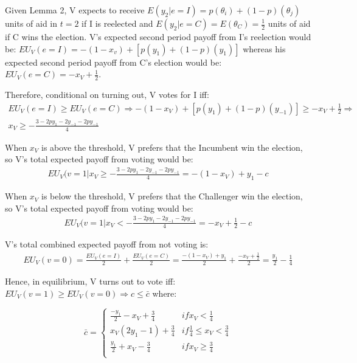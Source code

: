 \documentclass[12pt]{paper}
\begin{document}
Given Lemma 2, V expects to receive $E(y_2 | e=I) = p(\theta_i )+(1-p)(\theta_j)$ units of aid in $t=2$ if I is reelected and $E(y_2 |e=C)=E(\theta_C )=\frac{1}{2}$ units of aid if C wins the election.  V’s expected second period payoff from I’s reelection would be: $EU_V (e=I) = -(1 - x_v ) + [p(y_1 ) + (1 - p)(y_1 )]$ whereas his expected second period payoff from C’s election would be: $EU_V (e=C) = - x_V + \frac{1}{2}$. 

Therefore, conditional on turning out, V votes for I iff: 
\begin{gather}
EU_V (e=I) \geq EU_V (e=C) \Rightarrow 
-(1 - x_V ) + [p(y_1 ) + (1 - p)(y_{-1} )] \geq - x_V + \frac{1}{2} \Rightarrow \\
x_V \geq -\frac{3 - 2py_1 - 2y_{-1} - 2py_{-1}}{4}
\end{gather}

When $x_V$ is above the threshold, V prefers that the Incumbent win the election, so V’s total expected payoff from voting would be:
\begin{gather}
 EU_V (v=1 | x_V \geq -\frac{3 - 2py_1 - 2y_{-1} - 2py_{-1}}{4} =
  - (1 - x_V ) + y_1 - c
\end{gather}

When $x_V$ is below the threshold, V prefers that the Challenger win the election, so V’s total expected payoff from voting would be:
\begin{gather}
 EU_V (v=1 | x_V < -\frac{3 - 2py_1 - 2y_{-1} - 2py_{-1}}{4} =
  -x_V + \frac{1}{2} - c
\end{gather}

V’s total combined expected payoff from not voting is:
\begin{gather}
EU_V (v=0) = \frac{EU_V (e=I)}{2} + \frac{EU_V (e=C)}{2} = 
\frac{- (1 - x_V ) + y_1}{2} + \frac{-x_V + \frac{1}{2}}{2} = 
\frac{y_1}{2} - \frac{1}{4}
\end{gather}

Hence, in equilibrium, V turns out to vote iff: $EU_V (v=1) \geq EU_V (v=0) \Rightarrow c \leq \bar{c}$ where:

\begin{equation}
\bar{c} =
\begin{cases}
\frac{-y_1}{2} - x_V + \frac{3}{4} & if x_V < \frac{1}{4}\\    
x_V (2y_1 - 1) + \frac{3}{4}     & if \frac{1}{4} \leq x_V < \frac{3}{4}  \\
\frac{y_1}{2} + x_V - \frac{3}{4}     & if x_V \geq \frac{3}{4}  \\
\end{cases}
\end{equation}
\end{document}

